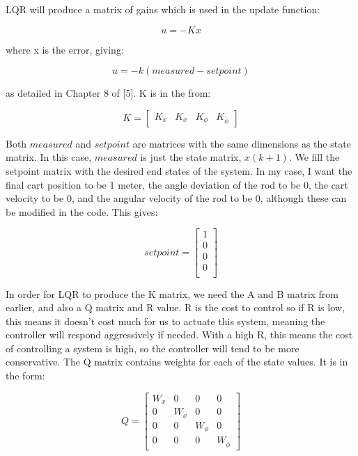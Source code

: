 \documentclass{article}
\begin{document}
LQR will produce a matrix of gains which is used in the update function:

\begin{equation}
    u = -Kx
\end{equation}

\noindent where x is the error, giving:

\begin{equation}
    u = -k(measured - setpoint)
\end{equation}

\noindent as detailed in Chapter 8 of [5]. K is in the from:

\begin{equation}
    K = 
    \begin{bmatrix}
        K_x & K_{\Dot{x}} & K_{\phi} & K_{\Dot{\phi}}
    \end{bmatrix}
\end{equation}

Both $measured$ and $setpoint$ are matrices with the same dimensions as the state matrix. In this case, $measured$ is just the state matrix, $x(k+1)$. We fill the setpoint matrix with the desired end states of the system. In my case, I want the final cart position to be 1 meter, the angle deviation of the rod to be 0, the cart velocity to be 0, and the angular velocity of the rod to be 0, although these can be modified in the code. This gives:

\begin{equation}
    setpoint = 
    \begin{bmatrix}
        1 \\
        0 \\
        0 \\
        0 \\
    \end{bmatrix}
\end{equation}

In order for LQR to produce the K matrix, we need the A and B matrix from earlier, and also a Q matrix and R value. R is the cost to control so if R is low, this means it doesn't cost much for us to actuate this system, meaning the controller will respond aggressively if needed. With a high R, this means the cost of controlling a system is high, so the controller will tend to be more conservative. The Q matrix contains weights for each of the state values. It is in the form:

\begin{equation}
    Q = 
    \begin{bmatrix}
        W_x & 0 & 0 & 0 \\
        0 & W_{\Dot{x}} & 0 & 0 \\
        0 & 0 & W_\phi & 0 \\
        0 & 0 & 0 & W_{\Dot{\phi}} 
    \end{bmatrix}
\end{equation}
\end{document}
